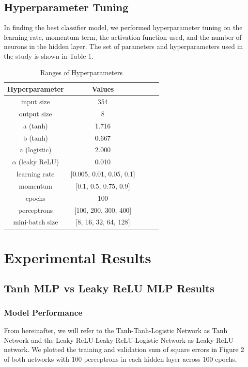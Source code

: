 \documentclass{acm_proc_article-sp}
\begin{document}
\subsection{Hyperparameter Tuning}
In finding the best classifier model, we performed hyperparameter tuning on the learning rate, momentum term, the activation function used, and the number of neurons in the hidden layer. The set of parameters and hyperparameters used in the study is shown in Table 1.

\begin{table}[h]
\centering
\caption{Ranges of Hyperparameters}
\begin{tabular}{ccccc}
\toprule
Hyperparameter & Values \\
\midrule
input size & 354 \\
output size & 8 \\
a (tanh) & 1.716 \\
b (tanh) & 0.667 \\
a (logistic) & 2.000 \\
$\alpha$ (leaky ReLU) & 0.010 \\
learning rate & [0.005, 0.01, 0.05, 0.1] \\
momentum & [0.1, 0.5, 0.75, 0.9] \\
epochs & 100 \\
perceptrons & [100, 200, 300, 400] \\
mini-batch size & [8, 16, 32, 64, 128] \\
\bottomrule
\end{tabular}
\end{table}

\section{Experimental Results}


\subsection{Tanh MLP vs Leaky ReLU MLP Results}


\subsubsection{Model Performance}
From hereinafter, we will refer to the Tanh-Tanh-Logistic Network as Tanh Network and the Leaky ReLU-Leaky ReLU-Logistic Network as Leaky ReLU network. We plotted the training and validation sum of square errors in Figure 2 of both networks with 100 perceptrons in each hidden layer across 100 epochs. 
\end{document}
